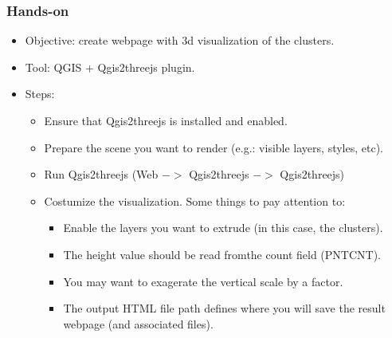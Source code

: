 \documentclass[hyperref={pdfpagelabels=true}]{beamer}
\begin{document}
\begin{frame}
\frametitle{Hands-on}
\begin{itemize}
  \item<1->Objective: create webpage with 3d visualization of the clusters.
  \item<1->Tool: QGIS + Qgis2threejs plugin.
  \item<1->Steps:  
  \begin{itemize}
    \item<2->Ensure that Qgis2threejs is installed and enabled.  
    \item<3->Prepare the scene you want to render (e.g.: visible layers, styles, etc).
    \item<4->Run Qgis2threejs (Web $->$ Qgis2threejs $->$ Qgis2threejs)
    \item<5->Costumize the visualization. Some things to pay attention to:
      \begin{itemize}
	\item<6->Enable the layers you want to extrude (in this case, the clusters).      
	\item<6->The height value should be read fromthe count field (PNTCNT).	
	\item<6->You may want to exagerate the vertical scale by a factor.
	\item<6->The output HTML file path defines where you will save the result webpage (and associated files).	
      \end{itemize}    
  \end{itemize}    
\end{itemize}  
\end{frame}

\end{document}
